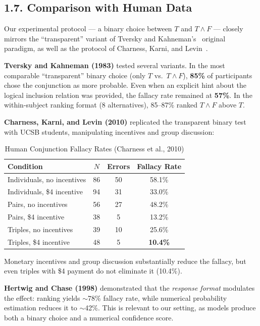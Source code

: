 \subsection*{1.7. Comparison with Human Data}
Our experimental protocol --- a binary choice between $T$ and $T \land F$ --- closely mirrors the ``transparent'' variant of Tversky and Kahneman's~\cite{tversky1983extensional} original paradigm, as well as the protocol of Charness, Karni, and Levin~\cite{charness2010social}.

\textbf{Tversky and Kahneman (1983)} tested several variants. In the most comparable ``transparent'' binary choice (only $T$ vs.\ $T \land F$), \textbf{85\%} of participants chose the conjunction as more probable. Even when an explicit hint about the logical inclusion relation was provided, the fallacy rate remained at \textbf{57\%}. In the within-subject ranking format (8 alternatives), 85--87\% ranked $T \land F$ above $T$.

\textbf{Charness, Karni, and Levin (2010)} replicated the transparent binary test with UCSB students, manipulating incentives and group discussion:

\begin{table}[h!]
\centering
\caption{Human Conjunction Fallacy Rates (Charness et al., 2010)}
\label{tab:human_linda}
\begin{tabular}{lccc}
\toprule
\textbf{Condition} & \textbf{$N$} & \textbf{Errors} & \textbf{Fallacy Rate} \\
\midrule
Individuals, no incentives       & 86  & 50  & 58.1\% \\
Individuals, \$4 incentive       & 94  & 31  & 33.0\% \\
Pairs, no incentives             & 56  & 27  & 48.2\% \\
Pairs, \$4 incentive             & 38  & 5   & 13.2\% \\
Triples, no incentives           & 39  & 10  & 25.6\% \\
Triples, \$4 incentive           & 48  & 5   & \textbf{10.4\%} \\
\bottomrule
\end{tabular}
\end{table}

Monetary incentives and group discussion substantially reduce the fallacy, but even triples with \$4 payment do not eliminate it (10.4\%).

\textbf{Hertwig and Chase (1998)} demonstrated that the \textit{response format} modulates the effect: ranking yields $\sim$78\% fallacy rate, while numerical probability estimation reduces it to $\sim$42\%. This is relevant to our setting, as models produce both a binary choice and a numerical confidence score.

